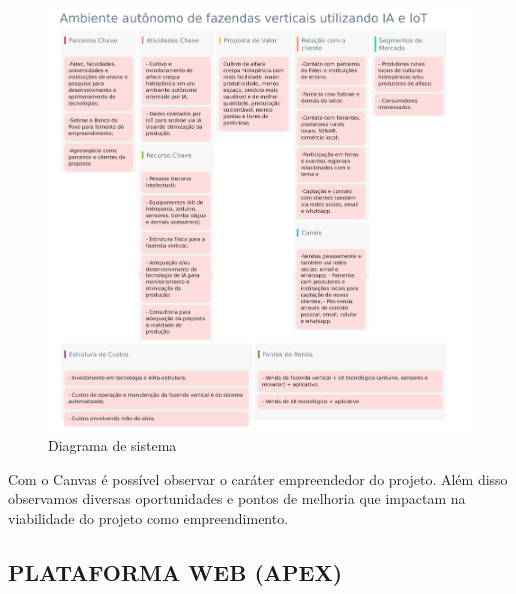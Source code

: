 \clearpage
\begin{figure}[!h]
\centering
\caption{Diagrama de sistema}
\label{fig:picture17}
\includegraphics[scale=0.8]{Illustrations/CANVAS.png}
\end{figure}

Com o Canvas é possível observar o caráter empreendedor do projeto. Além disso observamos diversas oportunidades e pontos de melhoria que impactam na viabilidade do projeto como empreendimento.

\subsection*{PLATAFORMA WEB (APEX)}

